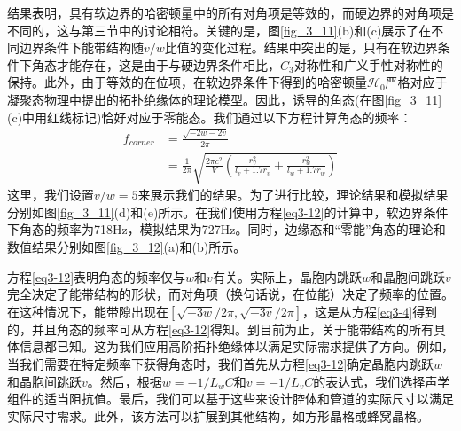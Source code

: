 结果表明，具有软边界的哈密顿量中的所有对角项是等效的，而硬边界的对角项是不同的，这与第三节中的讨论相符。关键的是，图\ref{fig_3_11}(b)和(c)展示了在不同边界条件下能带结构随\(v/w\)比值的变化过程。结果中突出的是，只有在软边界条件下角态才能存在，这是由于与硬边界条件相比，\(C_3\)对称性和广义手性对称性的保持。此外，由于等效的在位项，在软边界条件下得到的哈密顿量\(\mathcal{H}_0\)严格对应于凝聚态物理中提出的拓扑绝缘体的理论模型。因此，诱导的角态(在图\ref{fig_3_11}(c)中用红线标记)恰好对应于零能态。我们通过以下方程计算角态的频率：
\begin{equation}\label{eq3-12}
  \begin{aligned}
  f_{corner} &= \frac{\sqrt{-2w - 2v}}{2\pi}\\
  &= \frac{1}{2\pi}\sqrt{\frac{2\pi c^2}{V}\left(\frac{r_v^2}{l_v + 1.7r_v}+\frac{r_w^2}{l_w + 1.7r_w}\right)}
  \end{aligned}
  \end{equation}
这里，我们设置\(v/w = 5\)来展示我们的结果。为了进行比较，理论结果和模拟结果分别如图\ref{fig_3_11}(d)和(e)所示。在我们使用方程\ref{eq3-12}的计算中，软边界条件下角态的频率为718Hz，模拟结果为727Hz。同时，边缘态和“零能”角态的理论和数值结果分别如图\ref{fig_3_12}(a)和(b)所示。

方程\ref{eq3-12}表明角态的频率仅与\(w\)和\(v\)有关。实际上，晶胞内跳跃\(w\)和晶胞间跳跃\(v\)完全决定了能带结构的形状，而对角项（换句话说，在位能）决定了频率的位置。在这种情况下，能带隙出现在\([\sqrt{-3w}/2\pi,\sqrt{-3v}/2\pi]\)，这是从方程\ref{eq3-4}得到的，并且角态的频率可从方程\ref{eq3-12}得知。到目前为止，关于能带结构的所有具体信息都已知。这为我们应用高阶拓扑绝缘体以满足实际需求提供了方向。例如，当我们需要在特定频率下获得角态时，我们首先从方程\ref{eq3-12}确定晶胞内跳跃\(w\)和晶胞间跳跃\(v\)。然后，根据\(w = -1/L_wC\)和\(v = -1/L_vC\)的表达式，我们选择声学组件的适当阻抗值。最后，我们可以基于这些来设计腔体和管道的实际尺寸以满足实际尺寸需求。此外，该方法可以扩展到其他结构，如方形晶格或蜂窝晶格。

